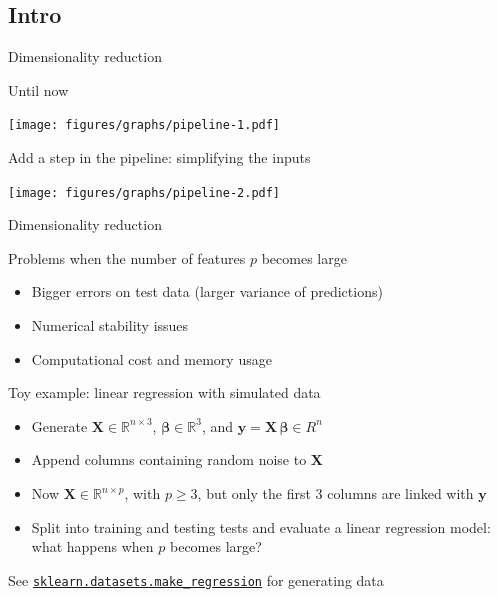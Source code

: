 \documentclass[presentation,mathserif,table]{beamer}
\newcommand{\X}{{\mathbold X}}
\newcommand{\bbeta}{{\mathbold \beta}}
\newcommand{\y}{{\mathbold y}}
\newcommand{\R}{\mathbb{R}}
\begin{document}
\subsection{Intro}
\label{sec:orgb42431d}
\begin{frame}[label={sec:orgaccec9a}]{Dimensionality reduction}
\begin{block}{Until now}
\begin{center}
\texttt{[image: figures/graphs/pipeline-1.pdf]}
\end{center}
\end{block}
\begin{block}{Add a step in the pipeline: simplifying the inputs}
\begin{center}
\texttt{[image: figures/graphs/pipeline-2.pdf]}
\end{center}
\end{block}
\end{frame}
\begin{frame}[label={sec:org6be13f0}]{Dimensionality reduction}
\begin{block}{Problems when the number of features \(p\) becomes large}
\begin{itemize}
\item Bigger errors on test data (larger variance of predictions)
\item Numerical stability issues
\item Computational cost and memory usage
\end{itemize}
\end{block}
\end{frame}
\begin{frame}[label={sec:orga6a7be0},fragile]{Toy example: linear regression with simulated data}
 \begin{itemize}
\item Generate \(\X \in \R^{n \times 3}\), \(\mathbold{\bbeta} \in \R^3\), and \(\y = \X \, \bbeta \in R^n\)
\item Append columns containing random noise to \(\X\)
\item Now \(\X \in \R^{n \times p}\), with \(p \geq 3\), but only the first 3 columns are linked with \(\y\)
\item Split into training and testing tests and evaluate a linear regression model: what happens when \(p\) becomes large?
\end{itemize}
\vfill

See \href{https://scikit-learn.org/stable/modules/generated/sklearn.datasets.make\_regression.html\#sklearn.datasets.make\_regression}{\texttt{sklearn.datasets.make\_regression}} for generating data
\end{frame}
\end{document}
